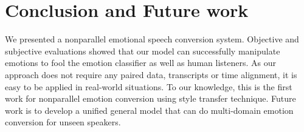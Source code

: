 \documentclass{article}
\begin{document}





\section{Conclusion and Future work}
\label{sec:con}
We presented a nonparallel emotional speech conversion system. Objective and subjective evaluations showed that our model can successfully manipulate emotions to fool the emotion classifier as well as human listeners. As our approach does not require any paired data, transcripts or time alignment, it is easy to be applied in real-world situations. To our knowledge, this is the first work for nonparallel emotion conversion using style transfer technique. Future work is to develop a unified general model that can do multi-domain emotion conversion for unseen speakers.
\end{document}
